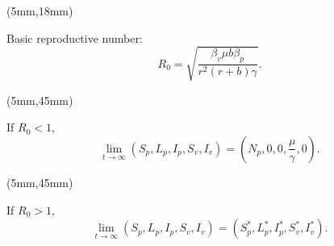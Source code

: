 	\begin{frame}
	
			\begin{textblock*}{55mm}(5mm,18mm)	
				\only<1,2,3>
				{
				\begin{greenbox}{Basic reproductive number:}
					\begin{equation*}
					R_0=\sqrt{\frac{\beta_v\mu b\beta_p}{r^2(r+b)\gamma}}.
					\end{equation*}
				\end{greenbox}
				}
			{	
				\begin{textblock*}{70mm}(5mm,45mm)
					\begin{yellowbox}{}
					
						If $R_0<1,$
						\begin{equation*}
						\lim\limits_{t\rightarrow \infty}(S_p,L_p,I_p,S_v,I_v)=(N_p,0,0,\frac{\mu}{\gamma},0).
						\end{equation*}
					\end{yellowbox}
				\end{textblock*}
			}
				{
				\begin{textblock*}{70mm}(5mm,45mm)
					\begin{yellowbox}{}
					If $R_0>1,$
						\begin{equation*}
							\lim\limits_{t\rightarrow \infty}(S_p,L_p,I_p,S_v,I_v)=(S_p^*,L_p^*,I_p^*,S_v^*,I_v^*).
						\end{equation*}
				
					\end{yellowbox}
				\end{textblock*}
				}
			

\end{textblock*}
\end{frame}
